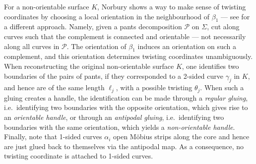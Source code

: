 \documentclass[12pt]{amsart}
\theoremstyle{plain}
\theoremstyle{definition}
\theoremstyle{remark}
\numberwithin{equation}{section}
\begin{document}
For a non-orientable surface $K$, Norbury \cite{Nor07} shows a way to make sense of twisting coordinates by choosing a local orientation  in the neighbourhood of $\beta_1$ --- see \cite{PP13} for a different approach. Namely, given a pants decomposition $\mathcal{P}$ on $\Sigma$, cut along curves such that the complement is connected and orientable --- not necessarily along all curves in $\mathcal{P}$. The orientation of $\beta_1$ induces an orientation on such a complement, and this orientation determines twisting coordinates unambiguously. When reconstructing the original non-orientable surface $K$, one identifies two boundaries of the pairs of pants, if they corresponded to a 2-sided curve $\gamma_j$ in $K$, and hence are of the same length $\ell_j$, with a possible twisting $\theta_j$. When such a gluing creates a handle, the identification can be made through a \emph{regular gluing}, i.e.~identifying two boundaries with the opposite orientation, which gives rise to an \emph{orientable handle}, or through an \emph{antipodal gluing}, i.e.~identifying two boundaries with the same orientation, which yields a \emph{non-orientable handle}.
Finally, note that 1-sided curves $\alpha_i$ open M\"obius strips along the core and hence are just glued back to themselves via the antipodal map. As a consequence, no twisting coordinate is attached to 1-sided curves.





\end{document}
